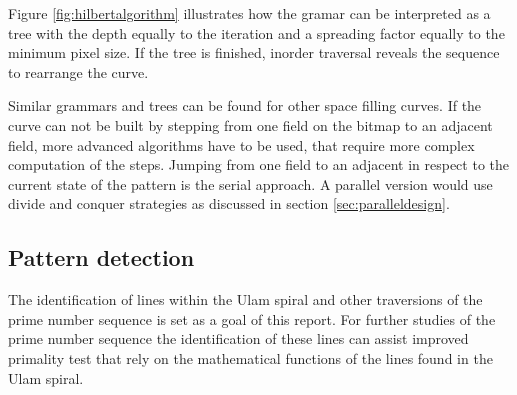 
Figure \ref{fig:hilbertalgorithm} illustrates how the gramar can be interpreted as a tree with the depth equally to the iteration and a spreading factor equally to the minimum pixel size. If the tree is finished, inorder traversal reveals the sequence to rearrange the curve. 


Similar grammars and trees can be found for other space filling curves. If the curve can not be built by stepping from one field on the bitmap to an adjacent field, more advanced algorithms have to be used, that require more complex computation of the steps. Jumping from one field to an adjacent in respect to the current state of the pattern is the serial approach. A parallel version would use divide and conquer strategies as discussed in section \ref{sec:paralleldesign}.

\subsection{Pattern detection}
\label{sec:pattern}
The identification of lines within the Ulam spiral and other traversions of the prime number sequence is set as a goal of this report. For further studies of the prime number sequence the identification of these lines can assist improved primality test that rely on the mathematical functions of the lines found in the Ulam spiral.

